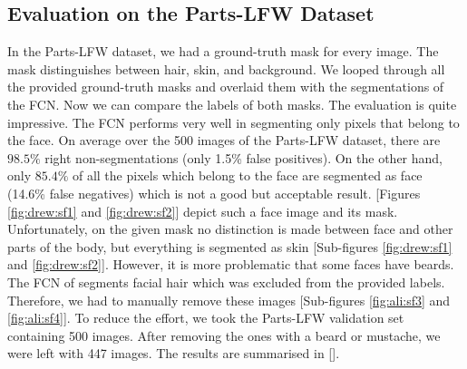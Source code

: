\subsection{Evaluation on the Parts-LFW Dataset}
In the Parts-LFW dataset, we had a ground-truth mask for every image. The mask distinguishes between hair, skin, and background. We looped through all the provided ground-truth masks and overlaid them with the segmentations of the FCN. Now we can compare the labels of both masks. The evaluation is quite impressive. The FCN performs very well in segmenting only pixels that belong to the face. On average over the 500 images of the Parts-LFW dataset, there are $98.5\%$ right non-segmentations (only 1.5\% false positives). On the other hand, only $85.4\%$ of all the pixels which belong to the face are segmented as face (14.6\% false negatives) which is not a good but acceptable result. [Figures \ref{fig:drew:sf1} and \ref{fig:drew:sf2}] depict such a face image and its mask. Unfortunately, on the given mask no distinction is made between face and other parts of the body, but everything is segmented as skin [Sub-figures \ref{fig:drew:sf1} and \ref{fig:drew:sf2}]. However, it is more problematic that some faces have beards. The FCN of \cite{nirkin2018_faceswap} segments facial hair which was excluded from the provided labels. Therefore, we had to manually remove these images [Sub-figures \ref{fig:ali:sf3} and \ref{fig:ali:sf4}]. To reduce the effort, we took the Parts-LFW validation set containing 500 images. After removing the ones with a beard or mustache, we were left with 447 images. The results are summarised in [].

